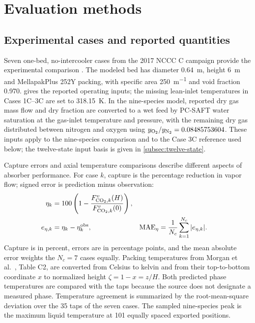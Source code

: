 \section{Evaluation methods}\label{sec:methods}
\subsection{Experimental cases and reported quantities}
Seven one-bed, no-intercooler cases from the 2017 NCCC C campaign provide the experimental comparison \cite{Morgan2020}.
The modeled bed has diameter \qty{0.64}{m}, height \qty{6}{m} and MellapakPlus 252Y packing, with specific area \qty{250}{m^{-1}} and void fraction 0.970.
 gives the reported operating inputs; the missing lean-inlet temperatures in Cases 1C--3C are set to \qty{318.15}{K}.
In the nine-species model, reported dry gas mass flow and dry \COtwo{} fraction are converted to a wet feed by PC-SAFT water saturation at the gas-inlet temperature and pressure, with the remaining dry gas distributed between nitrogen and oxygen using $y_{\Otwo}/y_{\Ntwo}=0.08485753604$.
These inputs apply to the nine-species comparison and to the Case 3C reference used below; the twelve-state input basis is given in \cref{subsec:twelve-state}.



Capture errors and axial temperature comparisons describe different aspects of absorber performance.
For case $k$, capture is the percentage reduction in vapor \COtwo{} flow; signed error is prediction minus observation:
\begin{align}
 \eta_k&=100\left(1-\frac{F_{\COtwo,k}^{\vap}(H)}{F_{\COtwo,k}^{\vap}(0)}\right),\label{eq:capture}\\
 e_{\eta,k}&=\eta_k-\eta_k^{\mathrm{obs}},&
 \mathrm{MAE}_{\eta}&=\frac{1}{N_c}\sum_{k=1}^{N_c}|e_{\eta,k}|.\label{eq:capture-error}
\end{align}
Capture is in percent, errors are in percentage points, and the mean absolute error weights the $N_c=7$ cases equally.
Packing temperatures from Morgan et al.\ \cite{Morgan2020}, Table C2, are converted from Celsius to kelvin and from their top-to-bottom coordinate $x$ to normalized height $\zeta=1-x=z/H$.
Both predicted phase temperatures are compared with the taps because the source does not designate a measured phase.
Temperature agreement is summarized by the root-mean-square deviation over the 35 taps of the seven cases.
The sampled nine-species peak is the maximum liquid temperature at 101 equally spaced exported positions.

